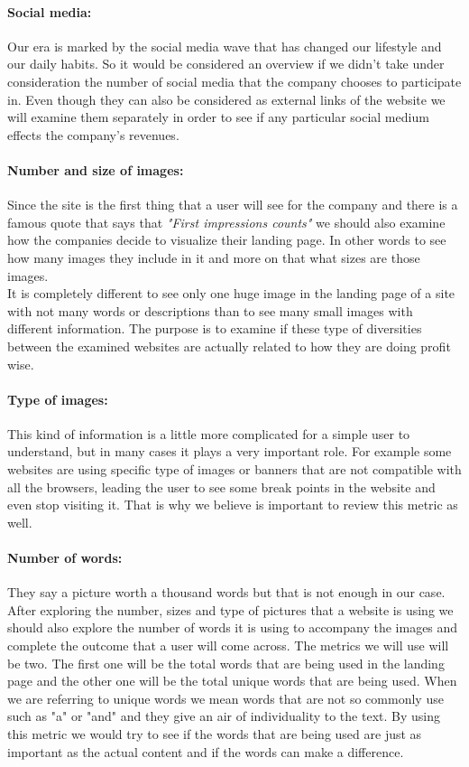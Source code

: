 \documentclass{article}
\begin{document}
\paragraph{Social media:}Our era is marked by the social media wave that has changed our lifestyle and our daily habits. So it would be considered an overview if we didn't take under consideration the number of social media that the company chooses to participate in. Even though they can also be considered as external links of the website we will examine them separately in order to see if any particular social medium effects the company's revenues.
\paragraph{Number and size of images:}Since the site is the first thing that a user will see for the company and there is a famous quote that says that \textit{"First impressions counts"} we should also examine how the companies decide to visualize their landing page. In other words to see how many images they include in it and more on that what sizes are those images.\\ It is completely different to see only one huge image in the landing page of a site with not many words or descriptions than to see many small images with different information. The purpose is to examine if these type of diversities between the examined websites are actually related to how they are doing profit wise.
\paragraph{Type of images:} This kind of information is a little more complicated for a simple user to understand, but in many cases it plays a very important role. For example some websites are using specific type of images or banners that are not compatible with all the browsers, leading the user to see some break points in the website and even stop visiting it. That is why we believe is important to review this metric as well.
\paragraph{Number of words:} They say a picture worth a thousand words but that is not enough in our case. After exploring the number, sizes and type of pictures that a website is using we should also explore the number of words it is using to accompany the images and complete the outcome that a user will come across. The metrics we will use will be two. The first one will be the total words that are being used in the landing page and the other one will be the total unique words that are being used. When we are referring to unique words we mean words that are not so commonly use such as "a" or "and" and they give an air of individuality to the text. By using this metric we would try to see if the words that are being used are just as important as the actual content and if the words can make a difference.
\end{document}
